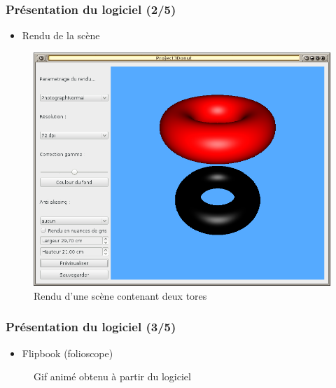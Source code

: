 \documentclass{beamer}
\begin{document}
%
\begin{frame}
\frametitle{Présentation du logiciel (2/5)}
\begin{itemize}[label=$\bullet$]
\item Rendu de la scène
\end{itemize}
\begin{figure}
\centering
\includegraphics[scale=0.28]{rendu.png}
\caption{Rendu d'une scène contenant deux tores}
\end{figure}

\end{frame}

%
\begin{frame}
\frametitle{Présentation du logiciel (3/5)}
\begin{itemize}[label=$\bullet$]
\item Flipbook (folioscope)
\end{itemize}
\begin{figure}
\centering
{}
\caption{Gif animé obtenu à partir du logiciel}
\end{figure}
\end{frame}
\end{document}
